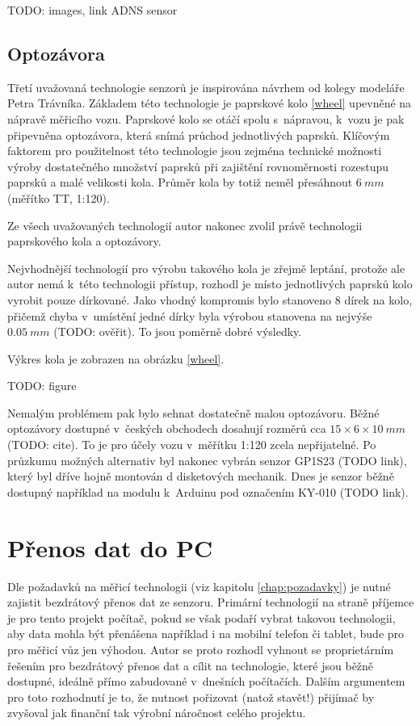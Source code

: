 TODO: images, link ADNS sensor

\subsection{Optozávora}
\label{subsec:wsm-senzor-optozavora}

Třetí uvažovaná technologie senzorů je inspirována návrhem od kolegy modeláře
Petra Trávníka. Základem této technologie je paprskové kolo \ref{wheel} upevněné
na nápravě měřicího vozu. Paprskové kolo se otáčí spolu s~nápravou, k~vozu je
pak připevněna optozávora, která snímá průchod jednotlivých paprsků. Klíčovým
faktorem pro použitelnost této technologie jsou zejména technické možnosti
výroby dostatečného množství paprsků při zajištění rovnoměrnosti rozestupu
paprsků a malé velikosti kola. Průměr kola by totiž neměl přesáhnout $6\ mm$
(měřítko TT, 1:120).

Ze všech uvažovaných technologií autor nakonec zvolil právě technologii
paprskového kola a optozávory.

Nejvhodnější technologií pro výrobu takového kola je zřejmě leptání, protože
ale autor nemá k~této technologii přístup, rozhodl je místo jednotlivých
paprsků kolo vyrobit pouze dírkované. Jako vhodný kompromis bylo stanoveno
8 dírek na kolo, přičemž chyba v~umístění jedné dírky byla výrobou stanovena na
nejvýše $0.05\ mm$ (TODO: ověřit). To jsou poměrně dobré výsledky.

Výkres kola je zobrazen na obrázku \ref{wheel}.

TODO: figure

Nemalým problémem pak bylo sehnat dostatečně malou optozávoru. Běžné optozávory
dostupné v~českých obchodech dosahují rozměrů cca $15\times6\times10\ mm$
(TODO: cite). To je pro účely vozu v~měřítku 1:120 zcela nepřijatelné. Po
průzkumu možných alternativ byl nakonec vybrán senzor GP1S23 (TODO link), který
byl dříve hojně montován d disketových mechanik. Dnes je senzor běžně dostupný
například na modulu k~Arduinu pod označením KY-010 (TODO link).

\section{Přenos dat do PC}
\label{sec:wsm-prenos-pc}

Dle požadavků na měřicí technologii (viz kapitolu \ref{chap:pozadavky}) je
nutné zajistit bezdrátový přenos dat ze senzoru. Primární technologií na straně
příjemce je pro tento projekt počítač, pokud se však podaří vybrat takovou
technologii, aby data mohla být přenášena například i na mobilní telefon či
tablet, bude pro pro měřicí vůz jen výhodou. Autor se proto rozhodl vyhnout se
proprietárním řešením pro bezdrátový přenos dat a cílit na technologie, které
jsou běžně dostupné, ideálně přímo zabudované v~dnešních počítačích. Dalším
argumentem pro toto rozhodnutí je to, že nutnost pořizovat (natož stavět!)
přijímač by zvyšoval jak finanční tak výrobní náročnost celého projektu.

